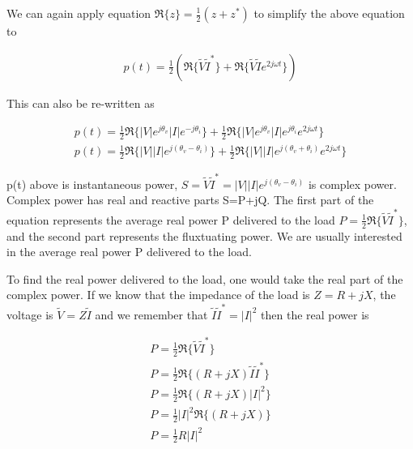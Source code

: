 \documentclass{ximera}
\begin{document}
We can again apply equation $\Re\{z\}=\frac{1}{2}(z +z^*)$ to simplify the above equation to

\begin{eqnarray}
p(t)=\frac{1}{2} (\Re\{\tilde{V}\tilde{I}^*\}+ \Re\{\tilde{V}\tilde{I} e^{2j \omega t }\})
\end{eqnarray}

This can also be re-written as

\begin{eqnarray}
p(t)=\frac{1}{2} \Re\{ |V| e^{j\theta_v} |I| e^{-j\theta_i} \}+ \frac{1}{2} \Re\{|V| e^{j\theta_v} |I| e^{j\theta_i} e^{2j \omega t }\} \\
p(t)=\frac{1}{2} \Re\{ |V| |I| e^{j(\theta_v-\theta_i)} \}+ \frac{1}{2} \Re\{|V| |I|  e^{j(\theta_v+\theta_i)}  e^{2j \omega t }\}
\end{eqnarray}


p(t) above is instantaneous power, $S=\tilde{V}\tilde{I}^*=|V| |I| e^{j(\theta_v-\theta_i)}$ is complex power. Complex power has real and reactive parts S=P+jQ. The first part of the equation represents the average real power P delivered to the load $P=\frac{1}{2}\Re\{\tilde{V}\tilde{I}^*\}$, and the second part represents the fluxtuating power. We are usually interested in the average real power P delivered to the load.

To find the real power delivered to the load, one would take the real part of the complex power. If we know that the impedance of the load is $Z=R+jX$, the voltage is $ \tilde{V} = Z \tilde{I}$ and we remember that $\tilde{I} \tilde{I}^* = |I|^2$ then the real power is

\begin{eqnarray}
P=\frac{1}{2}\Re\{ \tilde{V} \tilde{I}^*  \} \\
P=\frac{1}{2}\Re\{ (R+jX) \tilde{I} \tilde{I}^*  \} \\
P=\frac{1}{2}\Re\{ (R+jX) |I|^2  \} \\
P=\frac{1}{2}|I|^2 \Re\{ (R+jX)   \} \\
P=\frac{1}{2}R |I|^2 
\end{eqnarray}
\end{document}
